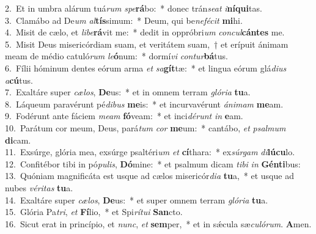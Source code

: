 {2.~}Et in umbra alárum tuá\textit{rum} \textit{spe}\textbf{rá}bo:~* donec trán\textit{se}\textit{at} \textit{i}\textbf{ní}\textbf{qui}tas.\\
{3.~}Clamábo ad De\textit{um} \textit{al}\textbf{tís}simum:~* Deum, qui be\textit{ne}\textit{fé}\textit{cit} \textbf{mi}hi.\\
{4.~}Misit de cælo, et \textit{li}\textit{be}\textbf{rá}vit me:~* dedit in oppróbri\textit{um} \textit{con}\textit{cul}\textbf{cán}\textbf{tes} me.\\
{5.~}Misit Deus misericórdiam suam, et veritátem suam,~† et erípuit ánimam meam de médio catuló\textit{rum} \textit{le}\textbf{ó}num:~* dormí\textit{vi} \textit{con}\textit{tur}\textbf{bá}tus.\\
{6.~}Fílii hóminum dentes eórum arma \textit{et} \textit{sa}\textbf{gít}tæ:~* et lingua eórum glá\textit{di}\textit{us} \textit{a}\textbf{cú}tus.\\
{7.~}Exaltáre super \textit{cæ}\textit{los}, \textbf{De}us:~* et in omnem terram \textit{gló}\textit{ri}\textit{a} \textbf{tu}a.\\
{8.~}Láqueum paravérunt pé\textit{di}\textit{bus} \textbf{me}is:~* et incurvavérunt \textit{á}\textit{ni}\textit{mam} \textbf{me}am.\\
{9.~}Fodérunt ante fáciem \textit{me}\textit{am} \textbf{fó}veam:~* et inci\textit{dé}\textit{runt} \textit{in} \textbf{e}am.\\
{10.~}Parátum cor meum, Deus, pará\textit{tum} \textit{cor} \textbf{me}um:~* cantábo, \textit{et} \textit{psal}\textit{mum} \textbf{di}cam.\\
{11.~}Exsúrge, glória mea, exsúrge psaltéri\textit{um} \textit{et} \textbf{cí}thara:~* ex\textit{súr}\textit{gam} \textit{di}\textbf{lú}\textbf{cu}lo.\\
{12.~}Confitébor tibi in pó\textit{pu}\textit{lis}, \textbf{Dó}mine:~* et psalmum dicam \textit{ti}\textit{bi} \textit{in} \textbf{Gén}\textbf{ti}bus:\\
{13.~}Quóniam magnificáta est usque ad cælos misericór\textit{di}\textit{a} \textbf{tu}a,~* et usque ad nubes \textit{vé}\textit{ri}\textit{tas} \textbf{tu}a.\\
{14.~}Exaltáre super \textit{cæ}\textit{los}, \textbf{De}us:~* et super omnem terram \textit{gló}\textit{ri}\textit{a} \textbf{tu}a.\\
{15.~}Glória Pa\textit{tri}, \textit{et} \textbf{Fí}lio,~* et Spi\textit{rí}\textit{tu}\textit{i} \textbf{San}cto.\\
{16.~}Sicut erat in princípio, et \textit{nunc}, \textit{et} \textbf{sem}per,~* et in sǽcula sæ\textit{cu}\textit{ló}\textit{rum}. \textbf{A}men.\\
